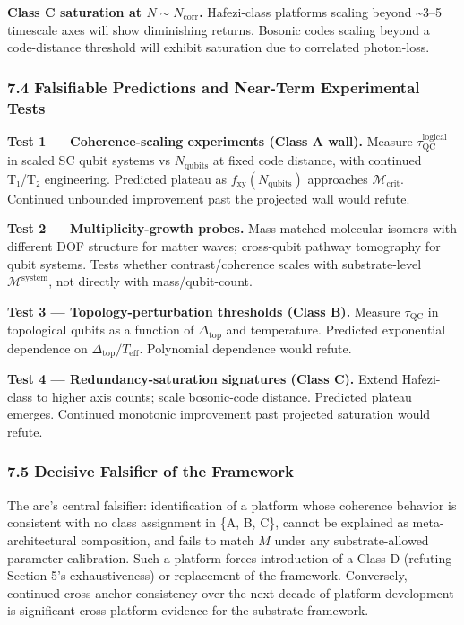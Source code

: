 \documentclass[
  11pt,
  a4paper,
]{article}
\begin{document}
\textbf{Class C saturation at \(N \sim N_{\mathrm{corr}}\).}
Hafezi-class platforms scaling beyond \textasciitilde3--5 timescale axes
will show diminishing returns. Bosonic codes scaling beyond a
code-distance threshold will exhibit saturation due to correlated
photon-loss.

\subsubsection{7.4 Falsifiable Predictions and Near-Term Experimental
Tests}\label{falsifiable-predictions-and-near-term-experimental-tests}

\textbf{Test 1 --- Coherence-scaling experiments (Class A wall).}
Measure \(\tau_{\mathrm{QC}}^{\mathrm{logical}}\) in scaled SC qubit
systems vs \(N_{\mathrm{qubits}}\) at fixed code distance, with
continued T₁/T₂ engineering. Predicted plateau as
\(f_{\mathrm{xy}}(N_{\mathrm{qubits}})\) approaches
\(\mathcal{M}_{\mathrm{crit}}\). Continued unbounded improvement past
the projected wall would refute.

\textbf{Test 2 --- Multiplicity-growth probes.} Mass-matched molecular
isomers with different DOF structure for matter waves; cross-qubit
pathway tomography for qubit systems. Tests whether contrast/coherence
scales with substrate-level \(\mathcal{M}^{\mathrm{system}}\), not
directly with mass/qubit-count.

\textbf{Test 3 --- Topology-perturbation thresholds (Class B).} Measure
\(\tau_{\mathrm{QC}}\) in topological qubits as a function of
\(\Delta_{\mathrm{top}}\) and temperature. Predicted exponential
dependence on \(\Delta_{\mathrm{top}}/T_{\mathrm{eff}}\). Polynomial
dependence would refute.

\textbf{Test 4 --- Redundancy-saturation signatures (Class C).} Extend
Hafezi-class to higher axis counts; scale bosonic-code distance.
Predicted plateau emerges. Continued monotonic improvement past
projected saturation would refute.

\subsubsection{7.5 Decisive Falsifier of the
Framework}\label{decisive-falsifier-of-the-framework}

The arc's central falsifier: identification of a platform whose
coherence behavior is consistent with no class assignment in \{A, B,
C\}, cannot be explained as meta-architectural composition, and fails to
match \(M\) under any substrate-allowed parameter calibration. Such a
platform forces introduction of a Class D (refuting Section 5's
exhaustiveness) or replacement of the framework. Conversely, continued
cross-anchor consistency over the next decade of platform development is
significant cross-platform evidence for the substrate framework.
\end{document}
